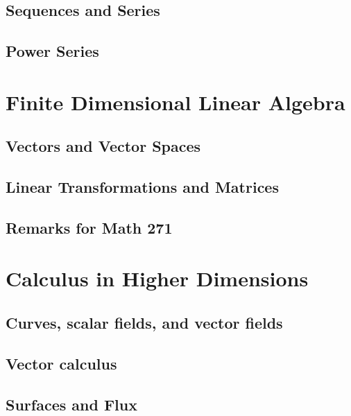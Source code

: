 \documentclass[12pt,letterpaper, openany]{book} %
\begin{document}
\chapter{Sequences and Series}


\chapter{Power Series}


\part{Finite Dimensional Linear Algebra}
\chapter{Vectors and Vector Spaces}


\chapter{Linear Transformations and Matrices}


\chapter*{Remarks for Math 271}


\part{Calculus in Higher Dimensions}

\chapter{Curves, scalar fields, and vector fields}


\chapter{Vector calculus}


\chapter{Surfaces and Flux}

\end{document}
